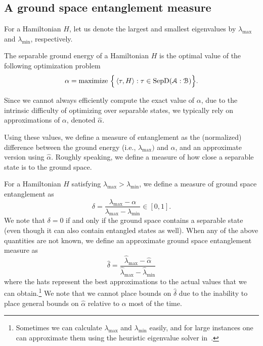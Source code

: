 
\subsection{A ground space entanglement measure} \label{ss:ch2_SEP-measure}

For a Hamiltonian $H$, let us denote the largest and smallest eigenvalues by $\lambda_{\mathrm{max}}$ and $\lambda_{\mathrm{min}}$, respectively.  

\begin{definition} 
The separable ground energy of a Hamiltonian $H$ is the optimal value of the following optimization problem 
\begin{equation} \label{eq:ch2_SEP-ThanosSnapHammy}
    \alpha = \text{maximize } \Big\{ \left\langle \tau, H \right\rangle : \tau \in \mathrm{SepD}(\mathcal{A}:\mathcal{B}) \Big\}. 
\end{equation} 
\end{definition} 

Since we cannot always efficiently compute the exact value of $\alpha$, due to the intrinsic difficulty of optimizing over separable states, we typically rely on approximations of $\alpha$, denoted $\hat{\alpha}$.  
 
Using these values, we define a measure of entanglement as the (normalized) difference between the ground energy (i.e., $\lambda_{\max})$ and $\alpha$, and an approximate version using $\hat{\alpha}$.  
Roughly speaking, we define a measure of how close a separable state is to the ground space. 
 
\begin{definition}
\label{def:ch2_SEP-groundspace_ent}
For a Hamiltonian $H$ satisfying $\lambda_\mathrm{max} > \lambda_\mathrm{min}$, we define a measure of ground space entanglement as 
\begin{equation}
    \delta = \frac{\lambda_{\mathrm{max}} - \alpha}{\lambda_{\mathrm{max}} - \lambda_{\mathrm{min}}} \in [0,1].
\end{equation}  
We note that $\delta = 0$ if and only if the ground space contains a separable state (even though it can also contain entangled states as well).   
When any of the above quantities are not known, we define an approximate ground space entanglement measure as 
\begin{equation}
    \hat{\delta} = \frac{\widehat{\lambda}_{\mathrm{max}} - \hat{\alpha}}{\widehat{\lambda}_{\mathrm{max}} - \widehat{\lambda}_{\mathrm{min}}} 
\end{equation}  
where the hats represent the best approximations to the actual values that we can obtain.\footnote{Sometimes we can calculate $\lambda_{\max}$ and $\lambda_{\min}$ easily, and for large instances one can approximate them using the heuristic eigenvalue solver in~\cite{bharti2022noisy}.} 
We note that we cannot place bounds on $\hat{\delta}$ due to the inability to place general bounds on $\hat{\alpha}$ relative to $\alpha$ most of the time. 
\end{definition} 

